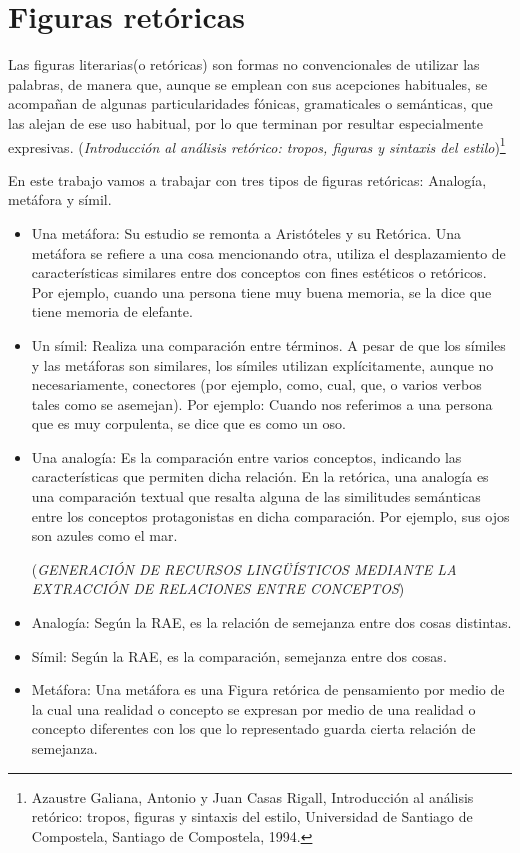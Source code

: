 \section{Figuras retóricas}

 Las figuras literarias(o retóricas) son formas no convencionales de utilizar las palabras, de manera que, aunque se emplean con sus acepciones habituales, se acompañan de algunas particularidades fónicas, gramaticales o semánticas, que las alejan de ese uso habitual, por lo que terminan por resultar especialmente expresivas. (\textit {Introducción al análisis retórico: tropos, figuras y sintaxis del estilo})\footnote{Azaustre Galiana, Antonio y Juan Casas Rigall, Introducción al análisis retórico: tropos, figuras y sintaxis del estilo, Universidad de Santiago de Compostela, Santiago de Compostela, 1994.}

En este trabajo vamos a trabajar con tres tipos de figuras retóricas: Analogía, metáfora y símil.
\begin{itemize}
	\item Una metáfora: Su estudio se remonta a Aristóteles y su Retórica. Una metáfora se refiere a una cosa mencionando otra, utiliza el desplazamiento de características similares entre dos conceptos con fines estéticos o retóricos. Por ejemplo, cuando una persona tiene muy buena memoria, se la dice que tiene memoria de elefante.
	
	\item Un símil: Realiza una comparación entre términos. A pesar de que los símiles y las metáforas son similares, los símiles utilizan explícitamente, aunque no necesariamente, conectores (por ejemplo, como, cual, que, o varios verbos tales como se asemejan).
	Por ejemplo: Cuando nos referimos a una persona que es muy corpulenta, se dice que es como un oso.
	
	\item Una analogía: Es la comparación entre varios conceptos, indicando las características que permiten dicha relación. En la retórica, una analogía es una comparación textual que resalta alguna de las similitudes semánticas entre los conceptos protagonistas en dicha comparación. Por ejemplo, sus ojos son azules como el mar.
	
(\textit {GENERACIÓN DE RECURSOS LINGÜÍSTICOS MEDIANTE LA EXTRACCIÓN DE RELACIONES ENTRE CONCEPTOS})	
	
\end{itemize}

\begin{itemize}
\item Analogía: Según la RAE, es la relación de semejanza entre dos cosas distintas.
\item Símil: Según la RAE, es la comparación, semejanza entre dos cosas.
\item Metáfora: Una metáfora es una Figura retórica de pensamiento por medio de la cual una realidad o concepto se expresan por medio de una realidad o concepto diferentes con los que lo representado guarda cierta relación de semejanza.
\end{itemize}



